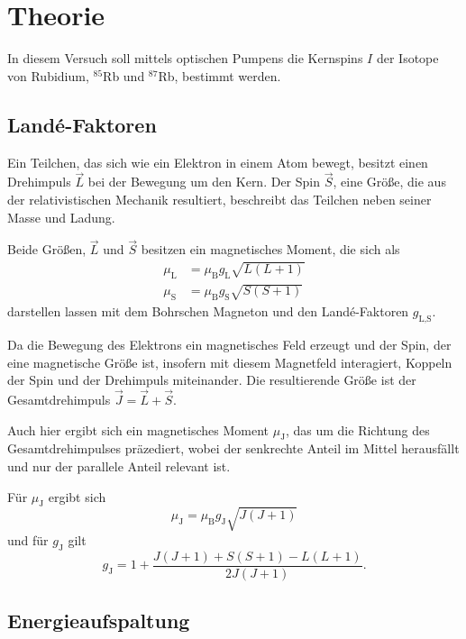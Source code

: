 \section{Theorie}
\label{sec:Theorie}
In diesem Versuch soll mittels optischen Pumpens die Kernspins $I$ der Isotope von Rubidium, $^{85}$Rb und $^{87}$Rb, bestimmt werden.

\subsection{Landé-Faktoren}

Ein Teilchen, das sich wie ein Elektron in einem Atom bewegt, besitzt einen Drehimpuls $\vec L$ bei der Bewegung um den Kern. 
Der Spin $\vec S$, eine Größe, die aus der relativistischen Mechanik resultiert, beschreibt das Teilchen neben seiner Masse und Ladung. 

Beide Größen, $\vec L$ und $\vec S$ besitzen ein magnetisches Moment, die sich als 
\begin{align*}
    \mu_\text{L} &= \mu_\text{B} g_\text{L} \sqrt{L(L+1)} \\ 
    \mu_\text{S} &= \mu_\text{B} g_\text{S} \sqrt{S(S+1)}
\end{align*}
darstellen lassen mit dem Bohrschen Magneton und den Landé-Faktoren $g_\text{L,S}$. 

Da die Bewegung des Elektrons ein magnetisches Feld erzeugt und der Spin, der eine magnetische Größe ist, insofern mit diesem Magnetfeld interagiert, Koppeln der Spin und der Drehimpuls miteinander. 
Die resultierende Größe ist der Gesamtdrehimpuls $\vec J = \vec L + \vec S$. 

Auch hier ergibt sich ein magnetisches Moment $\mu_\text{J}$, das um die Richtung des Gesamtdrehimpulses präzediert, wobei der senkrechte Anteil im Mittel herausfällt und nur der parallele Anteil relevant ist. 

Für $\mu_\text{J}$ ergibt sich 
\begin{equation*}
    \mu_\text{J} = \mu_\text{B} g_\text{J} \sqrt{J(J+1)}
\end{equation*}
und für $g_\text{J}$ gilt 
\begin{equation*}
    g_\text{J} = 1 + \frac{J(J+1) + S(S+1) - L(L+1)}{2J(J+1)}.
\end{equation*}

\subsection{Energieaufspaltung}

